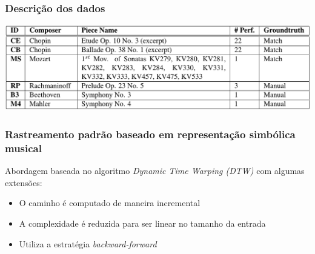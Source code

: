 \begin{frame}
  \frametitle{Descrição dos dados}
  \pause
  \begin{center}
    \includegraphics[width=\textwidth]{src/img/1-Table1-1.png}
  \end{center}
\end{frame}

\begin{frame}
  \frametitle{Rastreamento padrão baseado em representação simbólica musical}
  Abordagem baseada no algoritmo \emph{Dynamic Time Warping (DTW)} com algumas extensões:\pause
  \begin{itemize}
    \item O caminho é computado de maneira incremental\\\pause
    \item A complexidade é reduzida para ser linear no tamanho da entrada\pause
    \item Utiliza a estratégia \emph{backward-forward}
  \end{itemize}
\end{frame}

